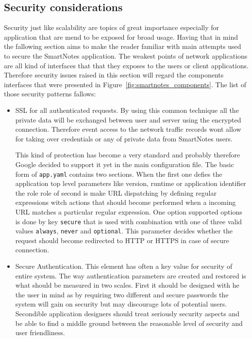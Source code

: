 \subsection{Security considerations}\label{subsec:security}
Security just like scalability are topics of great importance especially for application that  are mend to be exposed for broad usage. Having that in mind the fallowing section aims to make the reader familiar with main attempts used to secure the SmartNotes application. The weakest points of network applications are all kind of interfaces that that they exposes to the users or client applications.  Therefore security issues raised in this section will regard the components interfaces  that were presented in Figure~\ref{fig:smartnotes_components}. The list of those security patterns fallows:
\begin{itemize}
\item{SSL for all authenticated requests. By using this common technique all the private data will be exchanged between user and server using the encrypted connection. Therefore event access to the network traffic records wont allow for taking over credentials or any of private data from SmartNotes users. 

This kind of protection has become a very standard and probably therefore Google decided to support it yet in the main configuration file. The basic form of \texttt{app.yaml} contains two sections. When the first one defies the application top level parameters like version, runtime or application identifier the role role of second is make URL dispatching by defining regular expressions witch actions that should become performed when a incoming URL matches a particular regular expression. One option supported options is done by key \texttt{secure} that is used with combination with one of three valid values \texttt{always}, \texttt{never} and \texttt{optional}. This parameter decides whether the request should become redirected to HTTP or HTTPS in case of secure connection.}

\item{Secure Authentication. This element has often a key value for security of entire system. The way authentication parameters are created and restored is what should be measured in two scales. First it should be designed with he the user in mind as by requiring two different and secure passwords the system will gain on security but may discourage lots of potential users. Secondible application designers should treat seriously security aspects and be able to find a middle ground between the reasonable level of security and user friendliness.

}
\end{itemize}
